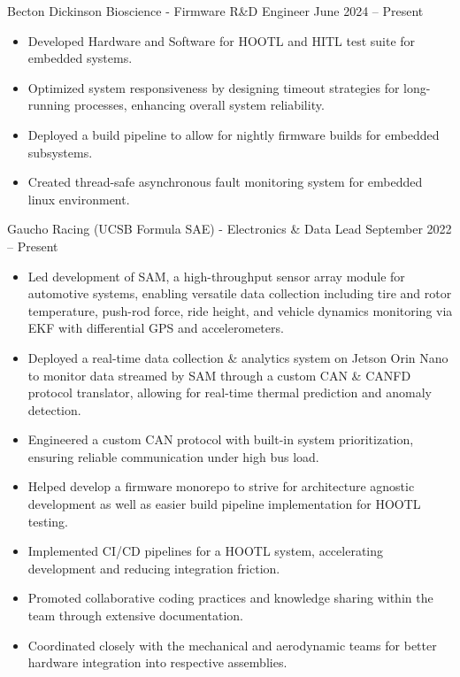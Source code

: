 \documentclass[9pt]{developercv} %
\begin{document}
\vspace{-14 pt}
\begin{entrylist}
    \entry
        {}
        {Becton Dickinson Bioscience - Firmware R\&D Engineer}
        {June 2024 – Present}
        {\vspace{-8pt}
        \begin{itemize}[noitemsep,topsep=0pt,parsep=0pt,partopsep=0pt, leftmargin=10pt]
            \item Developed Hardware and Software for HOOTL and HITL test suite for embedded systems. 
            \item Optimized system responsiveness by designing timeout strategies for long-running processes, enhancing overall system reliability. 
            \item Deployed a build pipeline to allow for nightly firmware builds for embedded subsystems.  
            \item Created thread-safe asynchronous fault monitoring system for embedded linux environment. 
        \end{itemize}}
    \entry
        {}
        {Gaucho Racing (UCSB Formula SAE) - Electronics \& Data Lead}
        {September 2022 – Present}
        {\vspace{-8pt}
        \begin{itemize}[noitemsep,topsep=0pt,parsep=0pt,partopsep=0pt, leftmargin=10pt]
            \item Led development of SAM, a high-throughput sensor array module for automotive systems, enabling versatile data collection including tire and rotor temperature, push-rod force, ride height, and vehicle dynamics monitoring via EKF with differential GPS and accelerometers.
            \item Deployed a real-time data collection \& analytics system on Jetson Orin Nano to monitor data streamed by SAM through a custom CAN \& CANFD protocol translator, allowing for real-time thermal prediction and anomaly detection. 
            \item Engineered a custom CAN protocol with built-in system prioritization, ensuring reliable communication under high bus load. 
            \item Helped develop a firmware monorepo to strive for architecture agnostic development as well as easier build pipeline implementation for HOOTL testing. 
            \item Implemented CI/CD pipelines for a HOOTL system, accelerating development and reducing integration friction.
            \item Promoted collaborative coding practices and knowledge sharing within the team through
            extensive documentation.
            \item Coordinated closely with the mechanical and aerodynamic teams for better hardware integration into respective assemblies.  
            
        \end{itemize}}
\end{entrylist}
\end{document}
